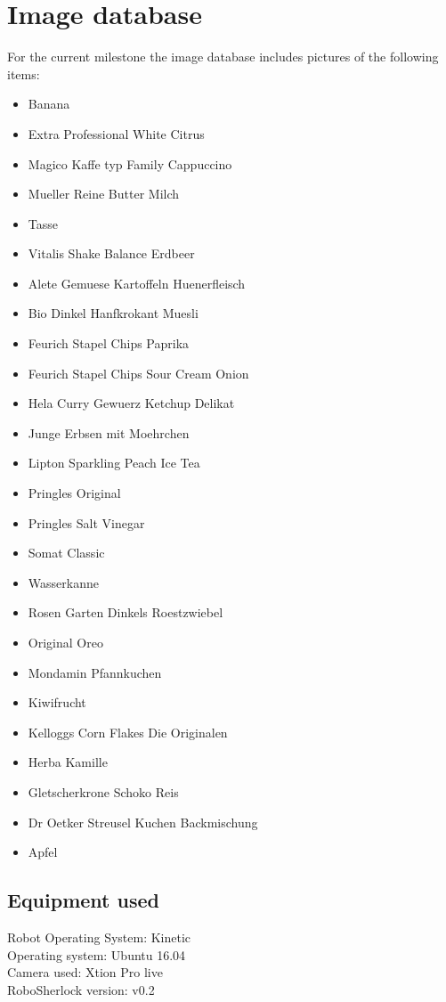 \documentclass[main.tex]{subfiles}
\begin{document}
		\section{Image database}
		For the current milestone the image database includes pictures of the following items:
		\begin{itemize}
		\item Banana
		\item Extra Professional White Citrus
		\item Magico Kaffe typ Family Cappuccino
		\item Mueller Reine Butter Milch
		\item Tasse
		\item Vitalis Shake Balance Erdbeer
		\item Alete Gemuese Kartoffeln Huenerfleisch
		\item Bio Dinkel Hanfkrokant Muesli
		\item Feurich Stapel Chips Paprika
		\item Feurich Stapel Chips Sour Cream Onion
		\item Hela Curry Gewuerz Ketchup Delikat
		\item Junge Erbsen mit Moehrchen
		\item Lipton Sparkling Peach Ice Tea
		\item Pringles Original
		\item Pringles Salt Vinegar
		\item Somat Classic
		\item Wasserkanne
		\item Rosen Garten Dinkels Roestzwiebel
		\item Original Oreo
		\item Mondamin Pfannkuchen
		\item Kiwifrucht
		\item Kelloggs Corn Flakes Die Originalen
		\item Herba Kamille
		\item Gletscherkrone Schoko Reis
		\item Dr Oetker Streusel Kuchen Backmischung
		\item Apfel
		\end{itemize}

			\subsection{Equipment used}
			Robot Operating System: Kinetic\\
			Operating system: Ubuntu 16.04\\
			Camera used: Xtion Pro live \\
			RoboSherlock version: v0.2
\end{document}
